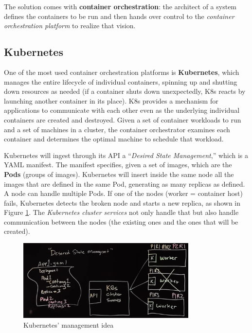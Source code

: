The solution comes with \textbf{container orchestration}: the architect of a system defines the containers to be run and then hands over control to the \emph{container orchestration platform} to realize that vision.

\subsection{Kubernetes}

One of the most used container orchestration platforms is \textbf{Kubernetes}, which manages the entire lifecycle of individual containers, spinning up and shutting down resources as needed (if a container shuts down unexpectedly, K8s reacts by launching another container in its place). K8s provides a mechanism for applications to communicate with each other even as the underlying individual containers are created and destroyed. Given a set of container workloads to run and a set of machines in a cluster, the container orchestrator examines each container and determines the optimal machine to schedule that workload.

Kubernetes will ingest through its API a ``\emph{Desired State Management},'' which is a YAML manifest. The manifest specifies, given a set of images, which are the \textbf{Pods} (groups of images). Kubernetes will insert inside the same node all the images that are defined in the same Pod, generating as many replicas as defined. A node can handle multiple Pods. If one of the nodes (worker = container host) fails, Kubernetes detects the broken node and starts a new replica, as shown in Figure \ref{fig:K8s5mins}. The \emph{Kubernetes cluster services} not only handle that but also handle communication between the nodes (the existing ones and the ones that will be created).

\begin{figure} [H]
    \centering
    \includegraphics[width=0.8\textwidth]{images/Cloud/K8s5mins.png}
    \caption{Kubernetes' management idea}
    \label{fig:K8s5mins}
\end{figure}

